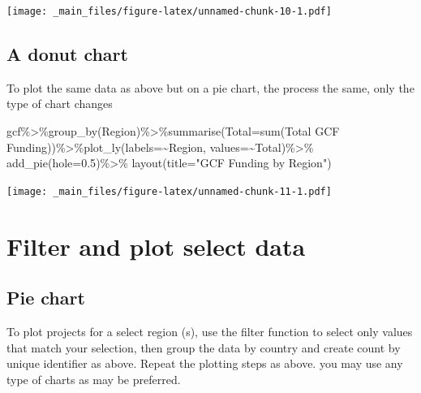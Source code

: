 \documentclass[
]{book}
\newenvironment{Shaded}{\begin{snugshade}}{\end{snugshade}}
\newcommand{\AttributeTok}[1]{\textcolor[rgb]{0.77,0.63,0.00}{#1}}
\newcommand{\FloatTok}[1]{\textcolor[rgb]{0.00,0.00,0.81}{#1}}
\newcommand{\FunctionTok}[1]{\textcolor[rgb]{0.00,0.00,0.00}{#1}}
\newcommand{\NormalTok}[1]{#1}
\newcommand{\OtherTok}[1]{\textcolor[rgb]{0.56,0.35,0.01}{#1}}
\newcommand{\SpecialCharTok}[1]{\textcolor[rgb]{0.00,0.00,0.00}{#1}}
\newcommand{\StringTok}[1]{\textcolor[rgb]{0.31,0.60,0.02}{#1}}
\begin{document}
\texttt{[image: \_main\_files/figure-latex/unnamed-chunk-10-1.pdf]}

\hypertarget{a-donut-chart}{%
\subsection{A donut chart}\label{a-donut-chart}}

To plot the same data as above but on a pie chart, the process the same, only the type of chart changes

\begin{Shaded}
\begin{Highlighting}[]
\NormalTok{gcf}\SpecialCharTok{\%\textgreater{}\%}\FunctionTok{group\_by}\NormalTok{(Region)}\SpecialCharTok{\%\textgreater{}\%}\FunctionTok{summarise}\NormalTok{(}\StringTok{\textquotesingle{}Total\textquotesingle{}}\OtherTok{=}\FunctionTok{sum}\NormalTok{(}\StringTok{\textasciigrave{}}\AttributeTok{Total GCF Funding}\StringTok{\textasciigrave{}}\NormalTok{))}\SpecialCharTok{\%\textgreater{}\%}\FunctionTok{plot\_ly}\NormalTok{(}\AttributeTok{labels=}\SpecialCharTok{\textasciitilde{}}\NormalTok{Region, }\AttributeTok{values=}\SpecialCharTok{\textasciitilde{}}\NormalTok{Total)}\SpecialCharTok{\%\textgreater{}\%} \FunctionTok{add\_pie}\NormalTok{(}\AttributeTok{hole=}\FloatTok{0.5}\NormalTok{)}\SpecialCharTok{\%\textgreater{}\%}
    \FunctionTok{layout}\NormalTok{(}\AttributeTok{title=}\StringTok{"GCF Funding by Region"}\NormalTok{)}
\end{Highlighting}
\end{Shaded}

\texttt{[image: \_main\_files/figure-latex/unnamed-chunk-11-1.pdf]}

\hypertarget{filter-and-plot-select-data}{%
\section{Filter and plot select data}\label{filter-and-plot-select-data}}

\hypertarget{pie-chart}{%
\subsection{Pie chart}\label{pie-chart}}

To plot projects for a select region (s), use the filter function to select only values that match your selection, then group the data by country and create count by unique identifier as above. Repeat the plotting steps as above. you may use any type of charts as may be preferred.
\end{document}
